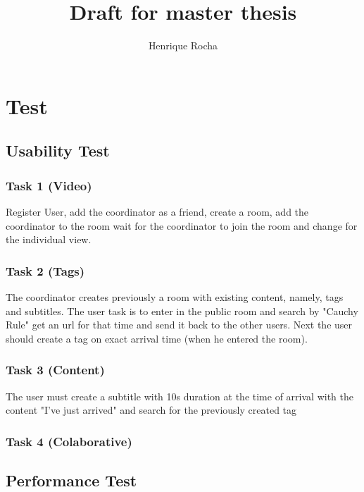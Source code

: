 \documentclass[
10pt, %
a4paper, %
oneside, %
]{scrartcl}
\title{Draft for master thesis} %
\author{Henrique Rocha}
\date{}
\begin{document}
	\maketitle %


	\section{Test}

\subsection{Usability Test}

	\subsubsection{Task 1 (Video)}
		Register User, add the coordinator as a friend, create a room, add the coordinator to the room wait for the coordinator to join the room and change for the individual view.
		
	\subsubsection{Task 2 (Tags)}
		The coordinator creates previously a room with existing content, namely, tags and subtitles.
		The user task is to enter in the public room and search by "Cauchy Rule" get an url for that time and send it back to the other users.
		Next the user should create a tag on exact arrival time (when he entered the room).
		
		
	\subsubsection{Task 3 (Content)}
		The user must create a subtitle with 10s duration at the time of arrival with the content "I've just arrived" and search for the previously created tag

	\subsubsection{Task 4 (Colaborative)}

			
\subsection{Performance Test}

	\begin{center}
	
	\end{center}

	\begin{center}
	
	\end{center}

	\begin{center}
	
	\end{center}
\end{document}
